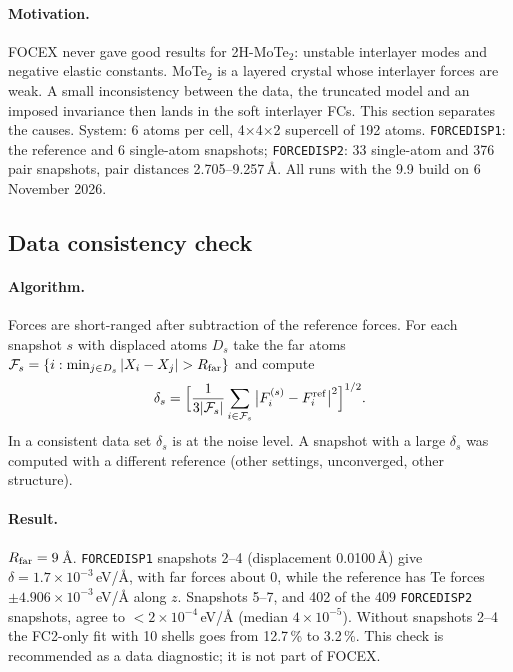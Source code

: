 \documentclass[11pt,a4paper]{article}
\newcommand{\code}[1]{\texttt{#1}}
\begin{document}
\paragraph{Motivation.} FOCEX never gave good results for 2H-MoTe$_2$: unstable interlayer modes and
negative elastic constants. MoTe$_2$ is a layered crystal whose interlayer forces are weak. A small
inconsistency between the data, the truncated model and an imposed invariance then lands in the soft
interlayer FCs. This section separates the causes. System: 6 atoms per cell, 4$\times$4$\times$2 supercell of 192
atoms. \code{FORCEDISP1}: the reference and 6 single-atom snapshots; \code{FORCEDISP2}: 33 single-atom and 376
pair snapshots, pair distances 2.705--9.257\,\AA. All runs with the 9.9 build on 6 November 2026.

\subsection{Data consistency check}
\paragraph{Algorithm.} Forces are short-ranged after subtraction of the reference forces. For each snapshot
$s$ with displaced atoms $D_s$ take the far atoms
$\mathcal F_s=\{i:\min_{j\in D_s}|X_i-X_j|>R_{\rm far}\}$ and compute
\begin{equation}
\delta_s=\Big[\frac1{3|\mathcal F_s|}\sum_{i\in\mathcal F_s}\big|F_i^{(s)}-F_i^{\rm ref}\big|^2\Big]^{1/2} .
\end{equation}
In a consistent data set $\delta_s$ is at the noise level. A snapshot with a large $\delta_s$ was computed
with a different reference (other settings, unconverged, other structure).

\paragraph{Result.} $R_{\rm far}=9$\,\AA. \code{FORCEDISP1} snapshots 2--4 (displacement 0.0100\,\AA) give
$\delta=1.7\times10^{-3}$\,eV/\AA, with far forces about 0, while the reference has Te forces $\pm4.906\times10^{-3}$\,eV/\AA{}
along $z$. Snapshots 5--7, and 402 of the 409 \code{FORCEDISP2} snapshots, agree to $<2\times10^{-4}$\,eV/\AA{}
(median $4\times10^{-5}$). Without snapshots 2--4 the FC2-only fit with 10 shells goes from 12.7\,\% to 3.2\,\%. This
check is recommended as a data diagnostic; it is not part of FOCEX.
\end{document}
